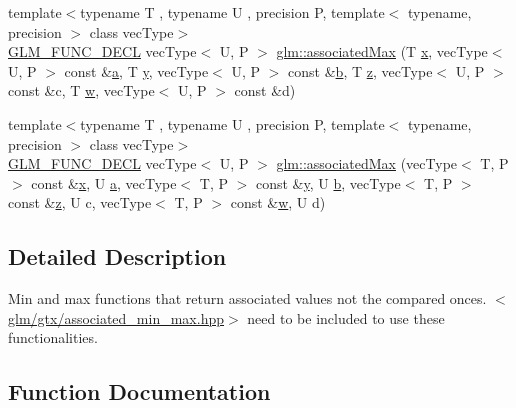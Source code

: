 \begin{DoxyCompactItemize}
\item 
{\footnotesize template$<$typename T , typename U , precision P, template$<$ typename, precision $>$ class vec\+Type$>$ }\\\mbox{\hyperlink{setup_8hpp_ab2d052de21a70539923e9bcbf6e83a51}{G\+L\+M\+\_\+\+F\+U\+N\+C\+\_\+\+D\+E\+CL}} vec\+Type$<$ U, P $>$ \mbox{\hyperlink{group__gtx__associated__min__max_ga7a165de1af9a3f9193516a3b47407086}{glm\+::associated\+Max}} (T \mbox{\hyperlink{glad_8h_a92d0386e5c19fb81ea88c9f99644ab1d}{x}}, vec\+Type$<$ U, P $>$ const \&\mbox{\hyperlink{glad_8h_ac8729153468b5dcf13f971b21d84d4e5}{a}}, T \mbox{\hyperlink{glad_8h_a66ddd433d2cacfe27f5906b7e86faeed}{y}}, vec\+Type$<$ U, P $>$ const \&\mbox{\hyperlink{glad_8h_a6eba317e3cf44d6d26c04a5a8f197dcb}{b}}, T \mbox{\hyperlink{glad_8h_acb78bf1972d3eaf07da34ff2e0a2f133}{z}}, vec\+Type$<$ U, P $>$ const \&c, T \mbox{\hyperlink{glad_8h_a1d0296e9e835f2e1ee17634af95fc1ec}{w}}, vec\+Type$<$ U, P $>$ const \&d)
\item 
{\footnotesize template$<$typename T , typename U , precision P, template$<$ typename, precision $>$ class vec\+Type$>$ }\\\mbox{\hyperlink{setup_8hpp_ab2d052de21a70539923e9bcbf6e83a51}{G\+L\+M\+\_\+\+F\+U\+N\+C\+\_\+\+D\+E\+CL}} vec\+Type$<$ U, P $>$ \mbox{\hyperlink{group__gtx__associated__min__max_ga3122fbe8133ea54749b10fb93e8a167e}{glm\+::associated\+Max}} (vec\+Type$<$ T, P $>$ const \&\mbox{\hyperlink{glad_8h_a92d0386e5c19fb81ea88c9f99644ab1d}{x}}, U \mbox{\hyperlink{glad_8h_ac8729153468b5dcf13f971b21d84d4e5}{a}}, vec\+Type$<$ T, P $>$ const \&\mbox{\hyperlink{glad_8h_a66ddd433d2cacfe27f5906b7e86faeed}{y}}, U \mbox{\hyperlink{glad_8h_a6eba317e3cf44d6d26c04a5a8f197dcb}{b}}, vec\+Type$<$ T, P $>$ const \&\mbox{\hyperlink{glad_8h_acb78bf1972d3eaf07da34ff2e0a2f133}{z}}, U c, vec\+Type$<$ T, P $>$ const \&\mbox{\hyperlink{glad_8h_a1d0296e9e835f2e1ee17634af95fc1ec}{w}}, U d)
\end{DoxyCompactItemize}


\subsection{Detailed Description}
Min and max functions that return associated values not the compared onces. $<$\mbox{\hyperlink{associated__min__max_8hpp}{glm/gtx/associated\+\_\+min\+\_\+max.\+hpp}}$>$ need to be included to use these functionalities. 



\subsection{Function Documentation}
\mbox{\label{group__gtx__associated__min__max_ga7d9c8785230c8db60f72ec8975f1ba45}} 
